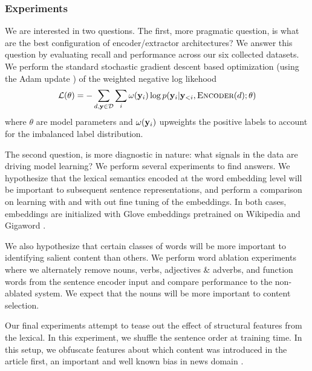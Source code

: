 \subsubsection{Experiments}

 We are interested in two questions. The first, more pragmatic question, is
 what are the best configuration of encoder/extractor architectures?
 We answer this question by evaluating \rouge{} recall and \meteor{} 
\citep{denkowski:lavie:meteor-wmt:2014}
 performance across our six collected datasets. We perform the standard
 stochastic gradient descent based optimization (using the Adam
 update \citep{kingma2014adam}) of the weighted negative log likehood 
 \[ \mathcal{L}(\theta) = -\sum_{d, \mathbf{y} \in \mathcal{D}} 
            \sum_i \omega(\mathbf{y}_i) 
        \log p(\mathbf{y}_i|\mathbf{y}_{<i}, \textsc{Encoder}(d); \theta) \]
        where $\theta$ are model parameters and $\omega(\mathbf{y}_i)$ upweights
        the positive labels to account for the imbalanced label distribution.


 The second question, is more diagnostic in nature: what signals
 in the data are driving model learning?
 We perform several experiments to find answers. 
 We hypothesize that the lexical semantics encoded at the word embedding
 level will be important to subsequent sentence representations, and
 perform a comparison on learning with and with out fine tuning of the 
 embeddings. In both cases, embeddings are initialized with Glove
 embeddings pretrained on Wikipedia and Gigaword \citep{pennington2014glove}.
 
 
 We also hypothesize that certain classes of words will be more important 
 to identifying salient content than others. We perform word ablation 
 experiments where we alternately remove nouns, verbs, adjectives \& adverbs,
 and function words from the sentence encoder input and compare performance 
 to the non-ablated system. We expect that the nouns will be more important
 to content selection. 


 Our final experiments attempt to tease out the effect of structural features 
 from the lexical. In this experiment, we shuffle the sentence order at 
 training time. In this setup, we obfuscate features about which content 
 was introduced in the article first, an important and well known bias in 
 news domain \citep{nenkova2005automatic}. 

